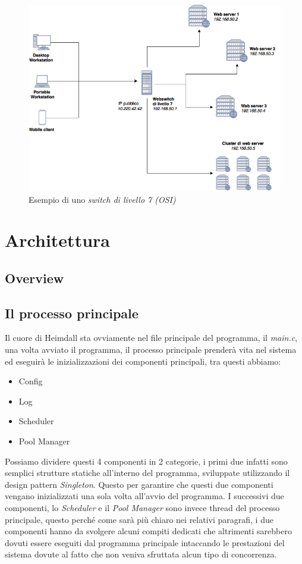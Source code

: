\documentclass[italian]{tktltiki2}
\begin{document}
\begin{figure}
\centering
\includegraphics[width=\textwidth]{images/switch7}
\caption{Esempio di uno \emph{switch di livello 7 (OSI)}}
\end{figure}

\newpage
\section{Architettura}
\label{sec:architecture}

\subsection{Overview}
\label{ssec:overview}

\subsection{Il processo principale}
\label{ssec:main_process}
Il cuore di Heimdall sta ovviamente nel file principale del programma, il \emph{main.c}, una volta avviato il programma, il processo principale prenderà vita nel sistema ed eseguirà le inizializzazioni dei componenti principali, tra questi abbiamo:

\begin{itemize}
	\item Config
	\item Log
	\item Scheduler
	\item Pool Manager
\end{itemize}
Possiamo dividere questi 4 componenti in 2 categorie, i primi due infatti sono semplici strutture statiche all'interno del programma, sviluppate utilizzando il design pattern \emph{Singleton}. Questo per garantire che questi due componenti vengano inizializzati una sola volta all'avvio del programma. I successivi due componenti, lo \emph{Scheduler} e il \emph{Pool Manager} sono invece thread del processo principale, questo perché come sarà più chiaro nei relativi paragrafi, i due componenti hanno da svolgere alcuni compiti dedicati che altrimenti sarebbero dovuti essere eseguiti dal programma principale intaccando le prestazioni del sistema dovute al fatto che non veniva sfruttata alcun tipo di concorrenza.
\end{document}
